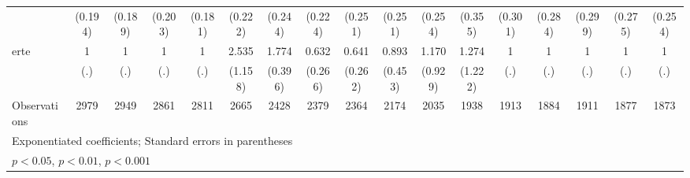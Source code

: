 {\begin{tabular}{l*{16}{c}}
                    &     (0.194)         &     (0.189)         &     (0.203)         &     (0.181)         &     (0.222)         &     (0.244)         &     (0.224)         &     (0.251)         &     (0.251)         &     (0.254)         &     (0.355)         &     (0.301)         &     (0.284)         &     (0.299)         &     (0.275)         &     (0.254)         \\
[1em]
erte                &           1         &           1         &           1         &           1         &       2.535\sym{*}  &       1.774\sym{*}  &       0.632         &       0.641         &       0.893         &       1.170         &       1.274         &           1         &           1         &           1         &           1         &           1         \\
                    &         (.)         &         (.)         &         (.)         &         (.)         &     (1.158)         &     (0.396)         &     (0.266)         &     (0.262)         &     (0.453)         &     (0.929)         &     (1.222)         &         (.)         &         (.)         &         (.)         &         (.)         &         (.)         \\
\hline
Observations        &        2979         &        2949         &        2861         &        2811         &        2665         &        2428         &        2379         &        2364         &        2174         &        2035         &        1938         &        1913         &        1884         &        1911         &        1877         &        1873         \\
\hline\hline
\multicolumn{17}{l}{\footnotesize Exponentiated coefficients; Standard errors in parentheses}\\
\multicolumn{17}{l}{\footnotesize \sym{*} \(p<0.05\), \sym{**} \(p<0.01\), \sym{***} \(p<0.001\)}\\
\end{tabular}
}

